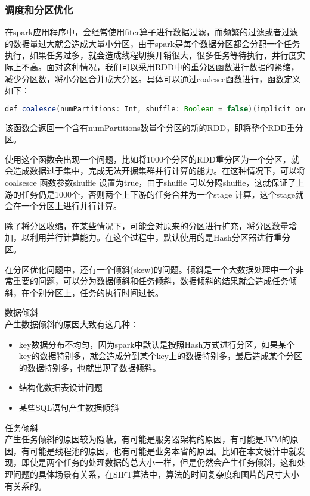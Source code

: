 \subsubsection{调度和分区优化}
在spark应用程序中，会经常使用fiter算子进行数据过滤，而频繁的过滤或者过滤的数据量过大就会造成大量小分区，由于spark是每个数据分区都会分配一个任务执行，如果任务过多，就会造成线程切换开销很大，很多任务等待执行，并行度实际上不高。面对这种情况，我们可以采用RDD中的重分区函数进行数据的紧缩，减少分区数，将小分区合并成大分区。具体可以通过coalesce函数进行，函数定义如下：
\begin{lstlisting}[language=Java,numbers=none,frame=none]
def coalesce(numPartitions: Int, shuffle: Boolean = false)(implicit ord: Ordering[T] = null): RDD[T]
\end{lstlisting}

该函数会返回一个含有numPartitions数量个分区的新的RDD，即将整个RDD重分区。

使用这个函数会出现一个问题，比如将1000个分区的RDD重分区为一个分区，就会造成数据过于集中，完成无法开掘集群并行计算的能力。在这种情况下，可以将coalsesce 函数参数shuffle 设置为true，由于shuffle 可以分隔shuffle，这就保证了上游的任务仍是1000个，否则两个上下游的任务合并为一个stage 计算，这个stage就会在一个分区上进行并行计算。

除了将分区收缩，在某些情况下，可能会对原来的分区进行扩充，将分区数量增加，以利用并行计算能力。在这个过程中，默认使用的是Hash分区器进行重分区。

在分区优化问题中，还有一个倾斜(skew)的问题。倾斜是一个大数据处理中一个非常重要的问题，可以分为数据倾斜和任务倾斜，数据倾斜的结果就会造成任务倾斜，在个别分区上，任务的执行时间过长。
\begin{compactenum}
\item 数据倾斜\\产生数据倾斜的原因大致有这几种：
\begin{itemize}
\item key数据分布不均匀，因为spark中默认是按照Hash方式进行分区，如果某个key的数据特别多，就会造成分到某个key上的数据特别多，最后造成某个分区的数据特别多，也就出现了数据倾斜。
\item 结构化数据表设计问题
\item 某些SQL语句产生数据倾斜
\end{itemize}

\item 任务倾斜\\产生任务倾斜的原因较为隐蔽，有可能是服务器架构的原因，有可能是JVM的原因，有可能是线程池的原因，也有可能是业务本省的原因。比如在本文设计中就发现，即使是两个任务的处理数据的总大小一样，但是仍然会产生任务倾斜，这和处理问题的具体场景有关系，在SIFT算法中，算法的时间复杂度和图片的尺寸大小有关系的。
\end{compactenum}

